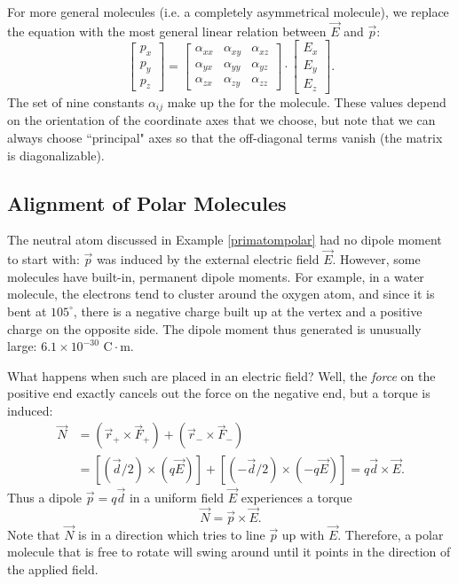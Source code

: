 For more general molecules (i.e. a completely asymmetrical molecule), we replace the equation with the most general linear relation between $\vec{E}$ and $\vec{p}$:
\[\begin{bmatrix}
p_x \\ p_y \\ p_z
\end{bmatrix}=\begin{bmatrix}
\alpha_{xx} & \alpha_{xy} & \alpha_{xz}\\
\alpha_{yx} & \alpha_{yy} & \alpha_{yz}\\
\alpha_{zx} & \alpha_{zy} & \alpha_{zz}
\end{bmatrix}\cdot\begin{bmatrix}
E_x \\ E_y \\ E_z
\end{bmatrix}.\]
The set of nine constants $\alpha_{ij}$ make up the  for the molecule. These values depend on the orientation of the coordinate axes that we choose, but note that we can always choose ``principal" axes so that the off-diagonal terms vanish (the matrix is diagonalizable).

\subsection{Alignment of Polar Molecules}

The neutral atom discussed in Example \ref{primatompolar} had no dipole moment to start with: $\vec{p}$ was induced by the external electric field $\vec{E}$. However, some molecules have built-in, permanent dipole moments. For example, in a water molecule, the electrons tend to cluster around the oxygen atom, and since it is bent at $105^\circ$, there is a negative charge built up at the vertex and a positive charge on the opposite side. The dipole moment thus generated is unusually large: $6.1\times 10^{-30}\text{ C}\cdot\text{m}$.

What happens when such  are placed in an electric field? Well, the \textit{force} on the positive end exactly cancels out the force on the negative end, but a torque is induced:
\begin{align*}
\vec{N}&=(\vec{r}_+\times \vec{F}_+)+(\vec{r}_-\times \vec{F}_-)\\
&=\left[(\vec{d}/2)\times (q\vec{E})\right]+\left[(-\vec{d}/2)\times (-q\vec{E})\right]=q\vec{d}\times \vec{E}.
\end{align*}
Thus a dipole $\vec{p}=q\vec{d}$ in a uniform field $\vec{E}$ experiences a torque
\[\vec{N}=\vec{p}\times\vec{E}.\]
Note that $\vec{N}$ is in a direction which tries to line $\vec{p}$ up with $\vec{E}$. Therefore, a polar molecule that is free to rotate will swing around until it points in the direction of the applied field.

